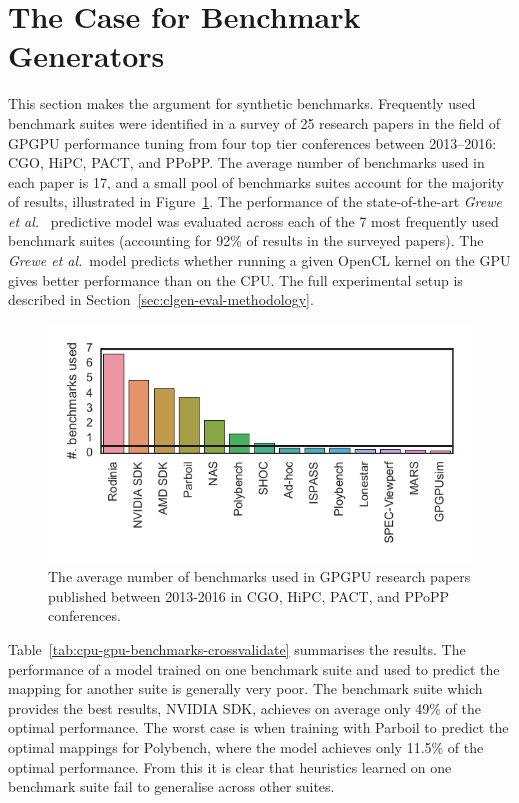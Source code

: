 \section{The Case for Benchmark Generators}%
\label{sec:the-case-for-benchmark-generators}

This section makes the argument for synthetic benchmarks. Frequently used benchmark suites were identified in a survey of 25 research papers in the field of GPGPU performance tuning from four top tier conferences between 2013--2016: CGO, HiPC, PACT, and PPoPP. The average number of benchmarks used in each paper is 17, and a small pool of benchmarks suites account for the majority of results, illustrated in Figure~\ref{fig:benchmark-suite-distribution}. The performance of the state-of-the-art \emph{Grewe et   al.}~\cite{Grewe2013} predictive model was evaluated across each of the 7 most frequently used benchmark suites (accounting for 92\% of results in the surveyed papers). The \emph{Grewe et   al.}~model predicts whether running a given OpenCL kernel on the GPU gives better performance than on the CPU. The full experimental setup is described in Section~\ref{sec:clgen-eval-methodology}.

\begin{figure}
	\includegraphics[width=\columnwidth]{img/motivation-c} %
	\caption[Benchmark counts in GPGPU research papers]{%
		The average number of benchmarks used in GPGPU research papers published between 2013-2016 in CGO, HiPC, PACT, and PPoPP conferences.%
	}%
	\label{fig:benchmark-suite-distribution}
\end{figure}

Table~\ref{tab:cpu-gpu-benchmarks-crossvalidate} summarises the results. The performance of a model trained on one benchmark suite and used to predict the mapping for another suite is generally very poor. The benchmark suite which provides the best results, NVIDIA SDK, achieves on average only 49\% of the optimal performance. The worst case is when training with Parboil to predict the optimal mappings for Polybench, where the model achieves only 11.5\% of the optimal performance. From this it is clear that heuristics learned on one benchmark suite fail to generalise across other suites.

